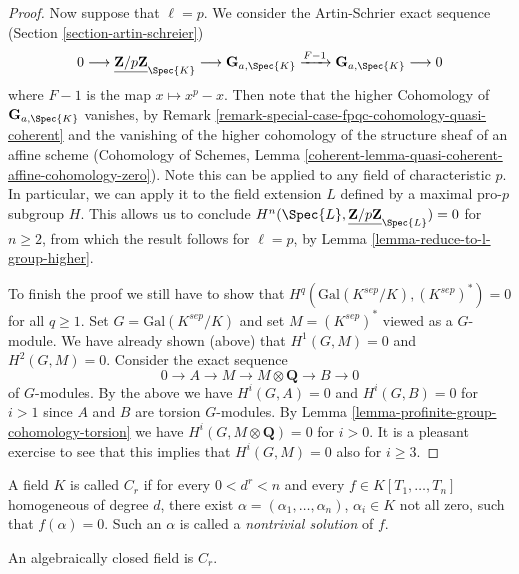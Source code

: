 \begin{proof}
\medskip\noindent
Now suppose that $\ell = p$. We consider the
Artin-Schrier exact sequence (Section \ref{section-artin-schreier})
$$
0 \longrightarrow \underline{\mathbf{Z}/p\mathbf{Z}}_{\Spec{K}} \longrightarrow
\mathbf{G}_{a, \Spec{K}} \xrightarrow{F-1} \mathbf{G}_{a, \Spec{K}} 
\longrightarrow 0
$$
where $F - 1$ is the map $x \mapsto x^p - x$. Then note that the higher 
Cohomology of $\mathbf{G}_{a, \Spec{K}}$ vanishes, by
Remark \ref{remark-special-case-fpqc-cohomology-quasi-coherent} and the 
vanishing of the higher cohomology of the structure sheaf of an affine scheme
(Cohomology of Schemes, Lemma
\ref{coherent-lemma-quasi-coherent-affine-cohomology-zero}).
Note this can be applied to any field of 
characteristic $p$. In particular, we can apply it to the field extension $L$ 
defined by a maximal pro-$p$ subgroup $H$. This allows us to conclude 
$H^n(\Spec{L}, \underline{\mathbf{Z}/p\mathbf{Z}}_{\Spec{L}}) = 0$
for $n \geq 2$, from which the result follows for $\ell = p$, by
Lemma \ref{lemma-reduce-to-l-group-higher}.

\medskip\noindent
To finish the proof we still have to show that
$H^q(\text{Gal}(K^{sep}/K), (K^{sep})^*) = 0$ for all $q \geq 1$.
Set $G = \text{Gal}(K^{sep}/K)$ and set $M = (K^{sep})^*$
viewed as a $G$-module. We have already shown (above) that
$H^1(G, M) = 0$ and $H^2(G, M) = 0$. Consider the exact sequence
$$
0 \to A \to M \to M \otimes \mathbf{Q} \to B \to 0
$$
of $G$-modules. By the above we have $H^i(G, A) = 0$
and $H^i(G, B) = 0$ for $i > 1$ since $A$ and $B$ are
torsion $G$-modules. By
Lemma \ref{lemma-profinite-group-cohomology-torsion}
we have $H^i(G, M \otimes \mathbf{Q}) = 0$ for $i > 0$.
It is a pleasant exercise to see that this implies that
$H^i(G, M) = 0$ also for $i \geq 3$.
\end{proof}


\begin{definition}
\label{definition-Cr}
A field $K$ is called {\it $C_r$}
if for every $0 < d^r < n$ and every $f \in K[T_1,
\ldots, T_n]$ homogeneous of degree $d$, there exist $\alpha = (\alpha_1,
\ldots, \alpha_n)$, $\alpha_i \in K$ not all zero, such that $f(\alpha) = 0$.
Such an $\alpha$ is called a {\it nontrivial solution} of $f$.
\end{definition}

\begin{example}
\label{example-algebraically-closed-field-Cr}
An algebraically closed field is $C_r$.
\end{example}

